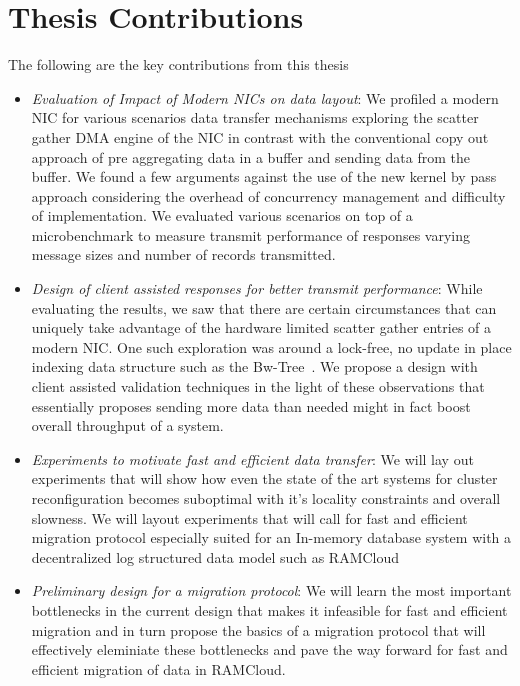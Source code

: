 \section{Thesis Contributions}
The following are the key contributions from this thesis
\begin{itemize}
\item{\em Evaluation of Impact of Modern NICs on data layout}: We profiled a modern NIC for various 
scenarios data transfer mechanisms exploring the scatter gather DMA engine of the NIC in contrast
with the conventional copy out approach of pre aggregating data in a buffer and sending data from the buffer.
We found a few arguments against the use of the new kernel by pass approach considering the overhead
of concurrency management and difficulty of implementation. We evaluated various scenarios on top of a
microbenchmark to measure transmit performance of responses varying message sizes and number of records
transmitted.
\item{\em Design of client assisted responses for better transmit performance}: While evaluating the results,
we saw that there are certain circumstances that can uniquely take advantage of the hardware limited 
scatter gather entries of a modern NIC. One such exploration was around a lock-free, no update in place 
indexing data structure such as the Bw-Tree~\cite{bw-tree}. We propose a design with client assisted 
validation techniques in the light of these observations that essentially proposes sending more data than 
needed might in fact boost overall throughput of a system.
\item{\em Experiments to motivate fast and efficient data transfer}: We will lay out experiments that will 
show how even the state of the art systems for cluster reconfiguration becomes suboptimal with it's locality
constraints and overall slowness. We will layout experiments that will call for fast and efficient migration protocol
especially suited for an In-memory database system with a decentralized log structured data model such as RAMCloud
\item{\em Preliminary design for a migration protocol}: We will learn the most important bottlenecks in the current design
that makes it infeasible for fast and efficient migration and in turn propose the basics of a migration protocol that 
will effectively eleminiate these bottlenecks and pave the way forward for fast and efficient migration of data in RAMCloud.
\end{itemize}

